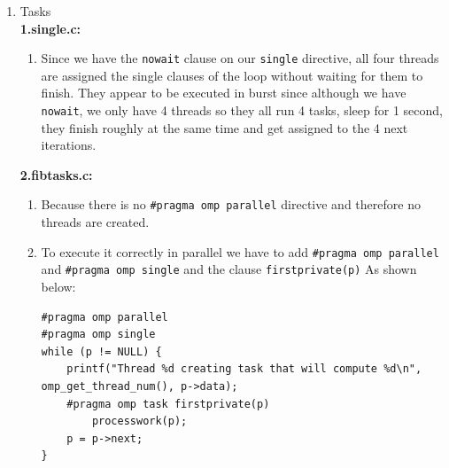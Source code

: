 \begin{enumerate}[label=\Alph*)]
\begin{enumerate}[label=\arabic*.]
        It seems there is no specific order in which the threads exit the barrier although in our experiments, most of the time, the last thread that
        outputs the \emph{wakes up and enters barrier} message is the first to exit it.
    \end{enumerate}
    \textbf{3.ordered.c:}
    \begin{enumerate}[label=\arabic*.]
        \item The order of the \emph{Outside} messages is non-deterministic since it depends on the dynamic scheduling of the threads.
        In the other hand, the order of the \emph{Inside} messages is always the same relative to themselves and they follow the order
        that the loop would have if executed sequentially (0, 1, 2, \dots, N).
        \item If we modify the clause \texttt{schedule} to include a chunk size of 2 like so: \texttt{schedule( dynamic, 2)} the tasks
        will get assigned 2 consecutive iteration of the loop.
    \end{enumerate}
    \item Tasks \\
    \textbf{1.single.c:}
    \begin{enumerate}[label=\arabic*.]
        \item Since we have the \texttt{nowait} clause on our \texttt{single} directive, all four threads are assigned the single clauses
        of the loop without waiting for them to finish. They appear to be executed in burst since although we have \texttt{nowait}, we only
        have 4 threads so they all run 4 tasks, sleep for 1 second, they finish roughly at the same time and get assigned to the 4 next iterations.
    \end{enumerate}
    \textbf{2.fibtasks.c:}
    \begin{enumerate}[label=\arabic*.]
        \item Because there is no \texttt{#pragma omp parallel} directive and therefore no threads are created.
        \item To execute it correctly in parallel we have to add \texttt{#pragma omp parallel}
         and \texttt{#pragma omp single} and the clause \texttt{firstprivate(p)} As shown below:

    \begin{verbatim}
#pragma omp parallel
#pragma omp single
while (p != NULL) {
    printf("Thread %d creating task that will compute %d\n", omp_get_thread_num(), p->data);
    #pragma omp task firstprivate(p)
        processwork(p);
    p = p->next;
}
    \end{verbatim}
     

\end{enumerate}
\end{enumerate}
